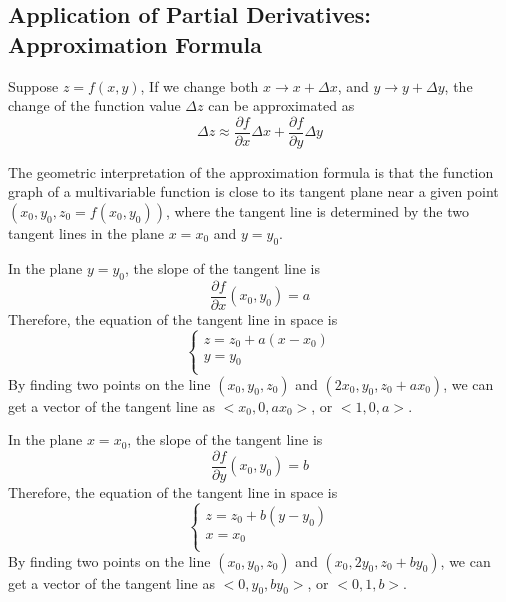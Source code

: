 \documentclass{article}
\begin{document}
\subsection{Application of Partial Derivatives: Approximation Formula}

Suppose $z = f(x, y)$, If we change both $x \to x + \Delta x$, and 
$y \to y + \Delta y$, the change of the function value $\Delta z$ can be 
approximated as
\begin{equation*}
  \Delta z \approx \frac{\partial f}{\partial x} \Delta x + \frac{\partial f}{\partial y} \Delta y
\end{equation*}

The geometric interpretation of the approximation formula is that the function 
graph of a multivariable function is close to its tangent plane near a given 
point $(x_0, y_0, z_0 = f(x_0, y_0))$, where the tangent line is determined by 
the two tangent lines in the plane $x = x_0$ and $y = y_0$.

In the plane $y = y_0$, the slope of the tangent line is
\begin{equation*}
  \frac{\partial f}{\partial x} (x_0, y_0) = a
\end{equation*}
Therefore, the equation of the tangent line in space is
\begin{equation*}
  \left\{ \begin{array}{ll}
    z = z_0 + a(x - x_0) \\
    y = y_0 \\
  \end{array} \right.
\end{equation*}
By finding two points on the line $(x_0, y_0, z_0)$ and 
$(2x_0, y_0, z_0 + ax_0)$, we can get a vector of the tangent line as 
$<x_0, 0, ax_0>$, or $<1, 0, a>$.

In the plane $x = x_0$, the slope of the tangent line is 
\begin{equation*}
  \frac{\partial f}{\partial y} (x_0, y_0) = b
\end{equation*}
Therefore, the equation of the tangent line in space is 
\begin{equation*}
  \left\{ \begin{array}{ll}
    z = z_0 + b(y - y_0) \\
    x = x_0 \\
  \end{array} \right.
\end{equation*}
By finding two points on the line $(x_0, y_0, z_0)$ and 
$(x_0, 2y_0, z_0 + by_0)$, we can get a vector of the tangent line as 
$<0, y_0, by_0>$, or $<0, 1, b>$.
\end{document}
